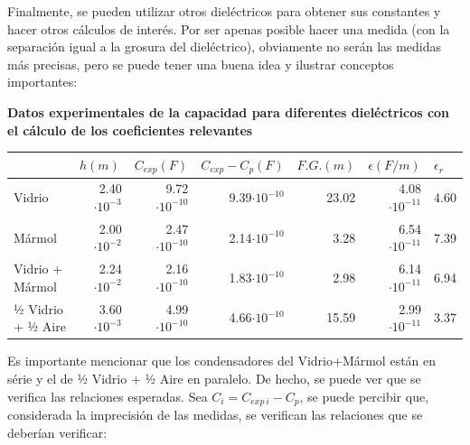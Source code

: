 \documentclass[a4paper,12pt]{article}
\begin{document}
Finalmente, se pueden utilizar otros dieléctricos para obtener sus constantes y hacer otros cálculos de interés. Por ser apenas posible hacer una medida (con la separación igual a la grosura del dieléctrico), obviamente no serán las medidas más precisas, pero se puede tener una buena idea y ilustrar conceptos importantes:

\begin{center}
    \textbf{Datos experimentales de la capacidad para diferentes dieléctricos con el cálculo de los coeficientes relevantes}
\end{center}
\begin{table}[h!] 
    \centering
    \begin{tabular}{|l|r|r|r|r|r|r|} 
    \cline{2-7}
    \multicolumn{1}{l|}{}& \multicolumn{1}{l|}{$h(m)$} & \multicolumn{1}{l|}{$C_{exp}(F)$} & \multicolumn{1}{l|}{$C_{exp}-C_p(F)$} & \multicolumn{1}{l|}{$F.G.(m)$} & \multicolumn{1}{l|}{$\epsilon (F/m)$} & \multicolumn{1}{l|}{$\epsilon_r$}  \\ 
    \hline
    Vidrio            & 2.40$\cdot 10^{-3}$                  & 9.72$\cdot 10^{-10}$                     & 9.39$\cdot 10^{-10}$                        & 23.02             & 4.08$\cdot 10^{-11}$              & 4.60                 \\ 
    \hline
    Mármol          & 2.00$\cdot 10^{-2}$                  & 2.47$\cdot 10^{-10}$                     & 2.14$\cdot 10^{-10}$                       & 3.28             & 6.54$\cdot 10^{-11}$              & 7.39                 \\ 
    \hline
    Vidrio + Mármol  & 2.24$\cdot 10^{-2}$                  & 2.16$\cdot 10^{-10}$                     & 1.83$\cdot 10^{-10}$                       & 2.98             & 6.14$\cdot 10^{-11}$              & 6.94                 \\ 
    \hline
    ½ Vidrio + ½ Aire & 3.60$\cdot 10^{-3}$                  & 4.99$\cdot 10^{-10}$                     & 4.66$\cdot 10^{-10}$                       & 15.59             & 2.99$\cdot 10^{-11}$              & 3.37                 \\
    \hline
    \end{tabular}
\end{table}

Es importante mencionar que los condensadores del Vidrio+Mármol están en série y el de ½ Vidrio + ½ Aire en paralelo. De hecho, se puede ver que se verifica las relaciones esperadas. Sea $C_i=C_{exp\ i} - C_p$, se puede percibir que, considerada la imprecisión de las medidas, se verifican las relaciones que se deberían verificar:
\end{document}
